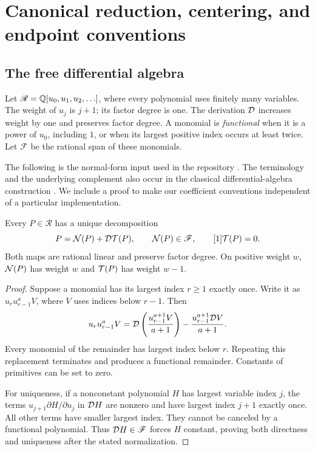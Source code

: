 \section{Canonical reduction, centering, and endpoint conventions}
\label{ag:sec:normal}

\subsection{The free differential algebra}
Let $\mathscr R=\mathbb Q[u_0,u_1,u_2,\ldots]$, where every polynomial uses
finitely many variables. The weight of $u_j$ is $j+1$; its factor degree
is one. The derivation $\mathcal D$ increases weight by one and preserves factor
degree. A monomial is \emph{functional} when it is a power of $u_0$,
including $1$, or when its largest positive index occurs at least twice.
Let $\mathscr F$ be the rational span of these monomials.

The following is the normal-form input used in the repository
\cite{Manuscript,HTG}. The terminology and the underlying complement
also occur in the classical differential-algebra construction
\cite[Section~4.4.1]{GRR}. We include a proof to make our coefficient
conventions independent of a particular implementation.

\begin{lemma}\label{ag:lem:normal}
Every $P\in\mathscr R$ has a unique decomposition
\begin{equation}\label{ag:eq:normal-decomp}
 P=\mathcal N(P)+\mathcal D\mathcal T(P),\qquad \mathcal N(P)\in\mathscr F,
                  \qquad [1]\mathcal T(P)=0.
\end{equation}
Both maps are rational linear and preserve factor degree. On positive
weight $w$, $\mathcal N(P)$ has weight $w$ and $\mathcal T(P)$ has weight $w-1$.
\end{lemma}
\begin{proof}
Suppose a monomial has its largest index $r\ge1$ exactly once. Write it
as $u_r u_{r-1}^aV$, where $V$ uses indices below $r-1$. Then
\begin{equation}\label{ag:eq:ibp-step}
 u_r u_{r-1}^aV
 =\mathcal D\left(\frac{u_{r-1}^{a+1}V}{a+1}\right)
       -\frac{u_{r-1}^{a+1}\mathcal D V}{a+1}.
\end{equation}
Every monomial of the remainder has largest index below $r$. Repeating
this replacement terminates and produces a functional remainder.
Constants of primitives can be set to zero.

For uniqueness, if a nonconstant polynomial $H$ has largest variable
index $j$, the terms $u_{j+1}\partial H/\partial u_j$ in $\mathcal D H$ are
nonzero and have largest index $j+1$ exactly once. All other terms have
smaller largest index. They cannot be canceled by a functional
polynomial. Thus $\mathcal D H\in\mathscr F$ forces $H$ constant, proving
both directness and uniqueness after the stated normalization.
\end{proof}


